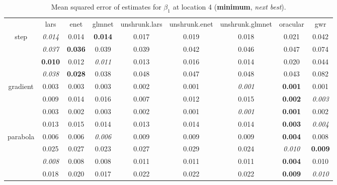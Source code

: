 \documentclass[authoryear, review, 11pt]{elsarticle}
\begin{document}
		\begin{table}[ht]
		\begin{center}
		\begin{tabular}{ccccccccc}
		  & lars & enet & glmnet & unshrunk.lars & unshrunk.enet & unshrunk.glmnet & oracular & gwr \\ 
		  \cline{2-9}
		  \multirow{4}{*}{step} & \emph{0.014} & 0.014 & \textbf{0.014} & 0.017 & 0.019 & 0.018 & 0.021 & 0.042 \\ 
		  & \emph{0.037} & \textbf{0.036} & 0.039 & 0.039 & 0.042 & 0.046 & 0.047 & 0.074 \\ 
		  & \textbf{0.010} & 0.012 & \emph{0.011} & 0.013 & 0.016 & 0.014 & 0.020 & 0.044 \\ 
		  & \emph{0.038} & \textbf{0.028} & 0.038 & 0.048 & 0.047 & 0.048 & 0.043 & 0.082 \\ 
		  \cline{2-9}
		  \multirow{4}{*}{gradient} & 0.003 & 0.003 & 0.003 & 0.002 & 0.001 & \emph{0.001} & \textbf{0.001} & 0.001 \\ 
		  & 0.009 & 0.014 & 0.016 & 0.007 & 0.012 & 0.015 & \textbf{0.002} & \emph{0.003} \\ 
		  & 0.003 & 0.002 & 0.003 & 0.002 & 0.001 & \emph{0.001} & \textbf{0.001} & 0.002 \\ 
		  & 0.013 & 0.015 & 0.014 & 0.013 & 0.014 & 0.014 & \textbf{0.003} & \emph{0.004} \\ 
		  \cline{2-9}
		  \multirow{4}{*}{parabola} & 0.006 & 0.006 & \emph{0.006} & 0.009 & 0.009 & 0.009 & \textbf{0.004} & 0.008 \\ 
		  & 0.025 & 0.027 & 0.023 & 0.027 & 0.029 & 0.024 & \emph{0.010} & \textbf{0.009} \\ 
		  & \emph{0.008} & 0.008 & 0.008 & 0.011 & 0.011 & 0.011 & \textbf{0.004} & 0.010 \\ 
		  & 0.018 & 0.020 & 0.017 & 0.022 & 0.022 & 0.022 & \textbf{0.009} & \emph{0.010} \\ 
		  \end{tabular}
		\caption{Mean squared error of estimates for $\beta_1$ at location 4 (\textbf{minimum}, \emph{next best}).\label{table:loc4-X1-MSEX}}
		\end{center}
		\end{table}
		
\end{document}
